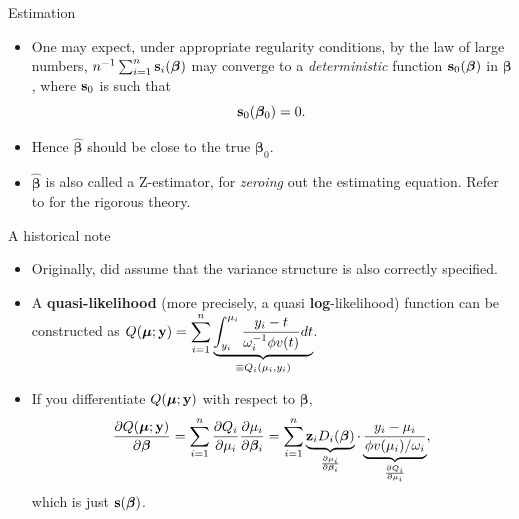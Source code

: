 \documentclass{beamer}
\newcommand{\boldbeta}{{\boldsymbol \beta}}
\newenvironment{wideitemize}%
  {\begin{itemize}%
    \setlength{\parskip}{1em}}%
  {\end{itemize}}
\begin{document}
\begin{frame} {Estimation}
\begin{wideitemize}



\item One may expect, under appropriate regularity conditions, by the law of large numbers, $n^{-1} \sum_{i = 1}^n {\bf s}_i ({\boldsymbol \beta})$ may converge to a  \emph{deterministic} function ${\bf s}_0 (\boldsymbol \beta)$ in $\boldsymbol \beta$, where ${\bf s}_0 $ is such that
\[
{\bf s}_0  (\boldbeta_0) = 0.
\] 


\item Hence ${\boldsymbol \hat{\boldsymbol \beta}}$ should be close to the true $\boldbeta_0$. 


\item   $\hat{\boldbeta}$ is also called a Z-estimator, for \emph{zeroing} out  the estimating equation. Refer to \cite[Chapter 5]{VDV1998}  for the rigorous theory. 

\end{wideitemize}

\end{frame}
\begin{frame} {A historical note }


\begin{wideitemize}
\item Originally, \cite{wedderburn1974} did assume that the variance structure is also correctly specified. 

\item
A \textbf{quasi-likelihood} (more precisely, a quasi {\bf log}-likelihood) function can be constructed as
$\displaystyle Q(\mbox{\boldmath $\mu$}; \textbf{y})=\sum_{i=1}^n
\underbrace{\int_{y_i}^{\mu_i}\frac{y_i-t}{\omega_i^{-1} 
\phi v(t)}dt}_{\equiv Q_i (\mu_i, y_i)}$.

\item If you differentiate $Q({\boldsymbol \mu}; {\bf y})$ with respect to $\boldsymbol \beta$, 
\[
\frac{\partial Q({\boldsymbol \mu}; \textbf{y})}{\partial \boldbeta} = \sum_{i=1}^n \frac{\partial Q_i}{ \partial \mu_i} \frac{\partial \mu_i}{ \partial \boldbeta_i} = \sum_{i=1}^n
\underbrace{\textbf{z}_i D_i(\mbox{\boldmath $\beta$}) }_{\frac{\partial \mu_i}{\partial \boldbeta_i}}
 \cdot
  \underbrace{\frac{y_i - \mu_i}{ \phi v(\mu_i)/\omega_i}}_{ \frac{\partial Q_i}{ \partial \mu_i}  },
\]
which is  just ${\bf s}({\boldsymbol \beta})$.

\end{wideitemize}
\end{frame}
\end{document}
